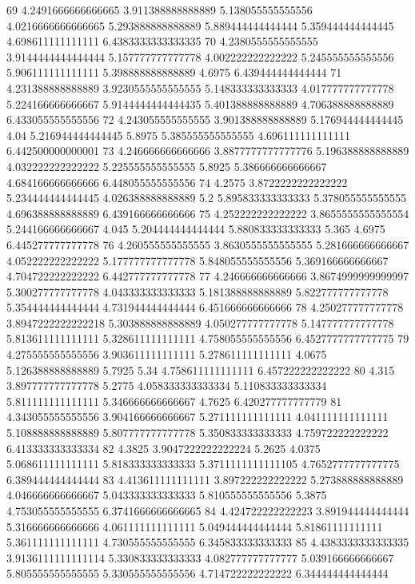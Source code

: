 69 4.2491666666666665 3.911388888888889 5.138055555555556 4.0216666666666665 5.293888888888889 5.889444444444444 5.359444444444445 4.698611111111111 6.4383333333333335
70 4.2380555555555555 3.9144444444444444 5.157777777777778 4.002222222222222 5.245555555555556 5.906111111111111 5.398888888888889 4.6975 6.439444444444444
71 4.231388888888889 3.9230555555555555 5.148333333333333 4.017777777777778 5.224166666666667 5.9144444444444435 5.401388888888889 4.706388888888889 6.433055555555556
72 4.243055555555555 3.901388888888889 5.176944444444445 4.04 5.216944444444445 5.8975 5.385555555555555 4.696111111111111 6.442500000000001
73 4.246666666666666 3.8877777777777776 5.196388888888889 4.032222222222222 5.225555555555555 5.8925 5.386666666666667 4.684166666666666 6.448055555555556
74 4.2575 3.8722222222222222 5.234444444444445 4.026388888888889 5.2 5.895833333333333 5.378055555555555 4.696388888888889 6.439166666666666
75 4.252222222222222 3.8655555555555554 5.244166666666667 4.045 5.204444444444444 5.880833333333333 5.365 4.6975 6.445277777777778
76 4.260555555555555 3.8630555555555555 5.281666666666667 4.052222222222222 5.177777777777778 5.848055555555556 5.369166666666667 4.704722222222222 6.442777777777778
77 4.246666666666666 3.8674999999999997 5.300277777777778 4.043333333333333 5.181388888888889 5.822777777777778 5.354444444444444 4.731944444444444 6.451666666666666
78 4.250277777777778 3.8947222222222218 5.303888888888889 4.050277777777778 5.147777777777778 5.813611111111111 5.328611111111111 4.758055555555556 6.4527777777777775
79 4.275555555555556 3.903611111111111 5.278611111111111 4.0675 5.126388888888889 5.7925 5.34 4.758611111111111 6.457222222222222
80 4.315 3.897777777777778 5.2775 4.058333333333334 5.110833333333334 5.811111111111111 5.346666666666667 4.7625 6.420277777777779
81 4.343055555555556 3.904166666666667 5.271111111111111 4.041111111111111 5.108888888888889 5.807777777777778 5.350833333333333 4.759722222222222 6.413333333333334
82 4.3825 3.9047222222222224 5.2625 4.0375 5.068611111111111 5.818333333333333 5.3711111111111105 4.7652777777777775 6.389444444444444
83 4.413611111111111 3.897222222222222 5.273888888888889 4.046666666666667 5.043333333333333 5.810555555555556 5.3875 4.753055555555555 6.3741666666666665
84 4.424722222222223 3.891944444444444 5.316666666666666 4.061111111111111 5.049444444444444 5.81861111111111 5.361111111111111 4.730555555555555 6.345833333333333
85 4.4383333333333335 3.9136111111111114 5.330833333333333 4.082777777777777 5.039166666666667 5.805555555555555 5.330555555555556 4.714722222222222 6.344444444444444
